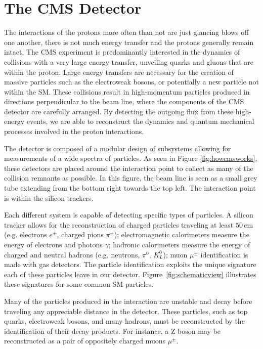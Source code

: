 \chapter{The CMS Detector}
\label{chap:detector}

The interactions of the protons more often than not are just glancing blows off one another, there is not much energy transfer and the protons generally remain intact. The CMS experiment is predominantly interested in the dynamics of collisions with a very large energy transfer, unveiling quarks and gluons that are within the proton. Large energy transfers are necessary for the creation of massive particles such as the electroweak bosons, or potentially a new particle not within the SM. These collisions result in high-momentum particles produced in directions perpendicular to the beam line, where the components of the CMS detector are carefully arranged. By detecting the outgoing flux from these high-energy events, we are able to reconstruct the dynamics and quantum mechanical processes involved in the proton interactions.

The detector is composed of a modular design of subsystems allowing for measurements of a wide spectra of particles. As seen in Figure \ref{fig:howcmsworks}, these detectors are placed around the interaction point to collect as many of the collision remnants as possible. In this figure, the beam line is seen as a small grey tube extending from the bottom right towards the top left. The interaction point is within the silicon trackers.

Each different system is capable of detecting specific types of particles. A silicon tracker allows for the reconstruction of charged particles traveling at least $50\,\mathrm{cm}$ (e.g. electrons $e^{\pm}$, charged pions $\pi^{\pm}$); electromagnetic calorimeters measure the energy of electrons and photons $\gamma$; hadronic calorimeters measure the energy of charged and neutral hadrons (e.g. neutrons, $\pi^{0}$, $K^{0}_{L}$); muon $\mu^{\pm}$ identification is made with gas detectors. The particle identification exploits the unique signature each of these particles leave in our detector. Figure~\ref{fig:schematicview} illustrates these signatures for some common SM particles. 

Many of the particles produced in the interaction are unstable and decay before traveling any appreciable distance in the detector. These particles, such as top quarks, electroweak bosons, and many hadrons, must be reconstructed by the identification of their decay products. For instance, a Z boson may be reconstructed as a pair of oppositely charged muons $\mu^{\pm}$.

